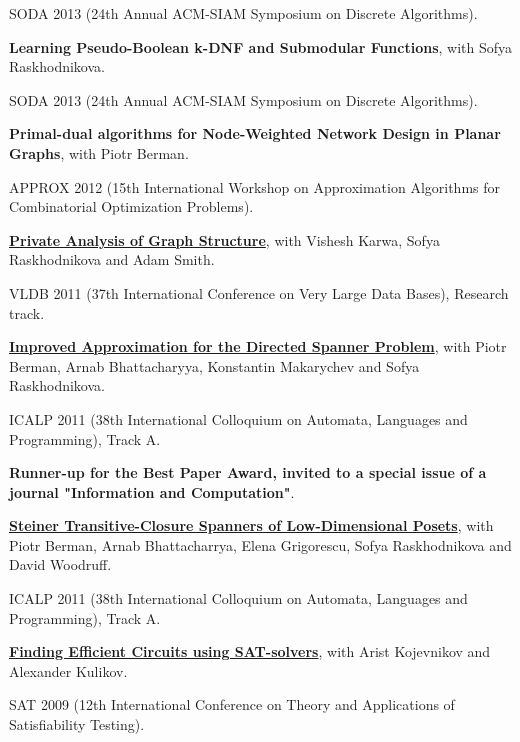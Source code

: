\documentclass[11pt]{article}
\newenvironment{lonelist}[1][\enskip\textbullet]%
        {\vspace{-\baselineskip}\begin{list}{#1}{%
        \setlength{\partopsep}{0pt}%
        \setlength{\topsep}{0pt}}}
        {\end{list}\vspace{-.6\baselineskip}}
\begin{document}
\begin{lonelist}
SODA 2013 (24th Annual ACM-SIAM Symposium on Discrete Algorithms).

\item \textbf{Learning Pseudo-Boolean k-DNF and Submodular Functions}, with Sofya Raskhodnikova.

SODA 2013 (24th Annual ACM-SIAM Symposium on Discrete Algorithms).

\item \textbf{Primal-dual algorithms for Node-Weighted Network Design in Planar Graphs}, with Piotr Berman.

APPROX 2012 (15th International Workshop on Approximation Algorithms for Combinatorial Optimization Problems).

\item \href{http://grigory.us/files/PrivateGraphStructure-VLDB11.pdf}{
    \textbf{Private Analysis of Graph Structure}},
with Vishesh Karwa, Sofya Raskhodnikova and Adam Smith.

VLDB 2011 (37th International Conference on Very Large Data Bases), Research track.

\item \href{http://grigory.us/files/publications/directed-spanners-journal-submitted.pdf}
{\textbf{Improved Approximation for the Directed Spanner Problem}}, with Piotr Berman, Arnab Bhattacharyya, Konstantin Makarychev and Sofya Raskhodnikova.

ICALP 2011 (38th International Colloquium on Automata, Languages and Programming), Track A. 

\textbf{Runner-up for the Best Paper Award, invited to a special issue of a journal "Information and Computation"}.

\item \href{http://grigory.us/files/steiner-ICALP11.pdf}{\textbf{Steiner Transitive-Closure Spanners of Low-Dimensional Posets}},
with Piotr Berman, Arnab Bhattacharrya, Elena Grigorescu, Sofya Raskhodnikova and David Woodruff.

ICALP 2011 (38th International Colloquium on Automata, Languages and Programming), Track A.

\item \href{http://grigory.us/files/publications/0903_SAT2009_Efficient_Boolean_Circuits.pdf}{\textbf{Finding Efficient Circuits using SAT-solvers}}, with
Arist Kojevnikov and Alexander Kulikov.

SAT 2009 (12th International Conference on Theory and Applications of Satisfiability Testing).

\end{lonelist}
\end{document}
